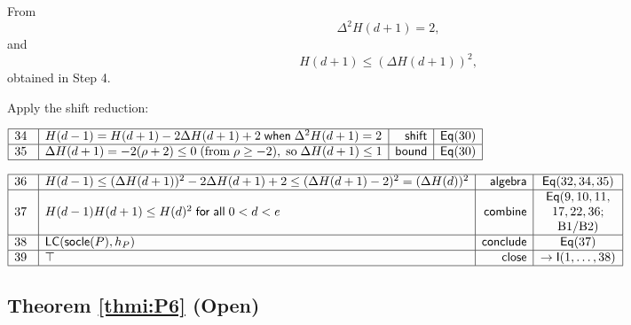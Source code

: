 \documentclass[11pt,reqno]{amsart}
\begin{document}
\noindent 
\noindent%
From 
\begin{equation*}
\Delta ^{2}H(d+1)=2,
\end{equation*}%
\noindent%
and 
\begin{equation*}
H(d+1)\leq (\Delta H(d+1))^{2},
\end{equation*}%
\noindent%
obtained in Step 4.

\noindent%
Apply the shift reduction: 

\bigskip 
\medskip%

$%
\begin{array}{|m{0.5cm}|l|r|c|}
\hline
34 & H(d-1)=H(d+1)-2\Delta H(d+1)+2\;\mathsf{when}\;\Delta ^{2}H(d+1)=2 & 
\mathsf{shift} & \mathsf{Eq}(30) \\ \hline
35 & \Delta H(d+1)=-2(\rho +2)\leq 0\;\text{(from}\;\rho \geq -2\text{)},\;%
\text{so}\;\Delta H(d+1)\leq 1 & \mathsf{bound} & \mathsf{Eq}(30) \\ \hline
\end{array}%
$

\nointerlineskip$%
\begin{array}{|m{0.5cm}|l|r|c|}
\hline
36 & H(d-1)\leq (\Delta H(d+1))^{2}-2\Delta H(d+1)+2\leq (\Delta
H(d+1)-2)^{2}=(\Delta H(d))^{2} & \mathsf{algebra} & \mathsf{Eq}(32,34,35)
\\ \hline
37 & H(d-1)H(d+1)\leq H(d)^{2}\;\mathsf{for\;all}\;0<d<e & \mathsf{combine}
& 
\begin{array}{c}
\mathsf{Eq}(9,10,11, \\ 
17,22,36; \\ 
\text{B1/B2})%
\end{array}
\\ \hline
38 & \mathsf{LC}(\mathsf{socle}(P),h_{P}) & \mathsf{conclude} & \mathsf{Eq}%
(37) \\ \hline
39 & \top  & \mathsf{close} & \rightarrow \mathsf{I}(1,\dots ,38) \\ \hline
\end{array}%
$

\medskip

\subsection*{Theorem \protect\ref{thmi:P6} (Open)}
\end{document}
